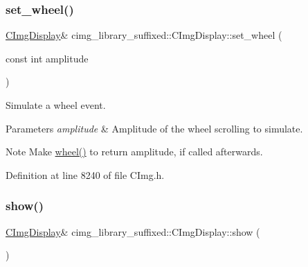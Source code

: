 \subsubsection{\texorpdfstring{set\+\_\+wheel()}{set\_wheel()}\hspace{0.1cm}{\footnotesize\ttfamily [2/2]}}
{\footnotesize\ttfamily \hyperlink{structcimg__library__suffixed_1_1CImgDisplay}{C\+Img\+Display}\& cimg\+\_\+library\+\_\+suffixed\+::\+C\+Img\+Display\+::set\+\_\+wheel (\begin{DoxyParamCaption}\item[{const int}]{amplitude }\end{DoxyParamCaption})\hspace{0.3cm}{\ttfamily [inline]}}



Simulate a wheel event. 


\begin{DoxyParams}{Parameters}
{\em amplitude} & Amplitude of the wheel scrolling to simulate. \\
\hline
\end{DoxyParams}
\begin{DoxyNote}{Note}
Make \hyperlink{structcimg__library__suffixed_1_1CImgDisplay_a652c48e6e55a89bc96c9ae24c99a828e}{wheel()} to return {\ttfamily amplitude}, if called afterwards. 
\end{DoxyNote}


Definition at line 8240 of file C\+Img.\+h.

\mbox{\label{structcimg__library__suffixed_1_1CImgDisplay_a40569e73fec12daeec84942b0d0f1b6d}} 
\subsubsection{\texorpdfstring{show()}{show()}}
{\footnotesize\ttfamily \hyperlink{structcimg__library__suffixed_1_1CImgDisplay}{C\+Img\+Display}\& cimg\+\_\+library\+\_\+suffixed\+::\+C\+Img\+Display\+::show (\begin{DoxyParamCaption}{ }\end{DoxyParamCaption})\hspace{0.3cm}{\ttfamily [inline]}}



